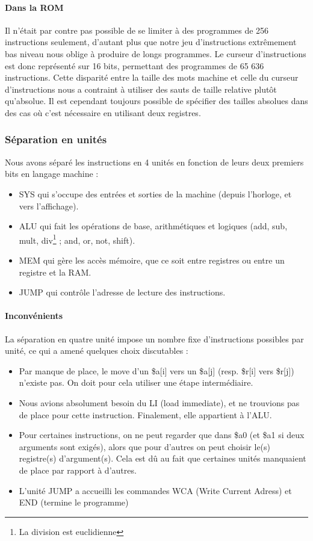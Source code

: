 \documentclass{article}
\begin{document}
\paragraph{Dans la ROM}
Il n'était par contre pas possible de se limiter à des programmes de 256 instructions
seulement, d'autant plus que notre jeu d'instructions extrêmement bas niveau nous
oblige à produire de longs programmes. Le curseur d'instructions est donc représenté
sur 16 bits, permettant des programmes de 65 636 instructions. Cette disparité
entre la taille des mots machine et celle du curseur d'instructions nous a contraint
à utiliser des sauts de taille relative plutôt qu'absolue. Il est cependant toujours
possible de spécifier des tailles absolues dans des cas où c'est nécessaire en
utilisant deux registres.

\subsubsection{Séparation en unités}
Nous avons séparé les instructions en 4 unités en fonction de leurs
deux premiers bits en langage machine :
\begin{itemize}
  \item SYS qui s'occupe des entrées et sorties de la machine (depuis
    l'horloge, et vers l'affichage).
  \item ALU qui fait les opérations de base, arithmétiques et logiques (add,
    sub, mult, div\footnote{La division est euclidienne} ; and, or, not, shift).
  \item MEM qui gère les accès mémoire, que ce soit entre registres ou entre un
  registre et la RAM.
  \item JUMP qui contrôle l'adresse de lecture des instructions.
\end{itemize}

\paragraph{Inconvénients}
La séparation en quatre unité impose un nombre fixe d'instructions possibles
par unité, ce qui a amené quelques choix discutables :
\begin{itemize}
  \item Par manque de place, le move d'un \$a[i] vers un \$a[j]
    (resp. \$r[i] vers \$r[j]) n'existe pas. On doit pour cela utiliser une
    étape intermédiaire.
  \item Nous avions absolument besoin du LI (load immediate), et ne trouvions
    pas de place pour cette instruction. Finalement, elle appartient à l'ALU.
  \item Pour certaines instructions, on ne peut regarder que dans \$a0 (et \$a1
    si deux arguments sont exigés), alors que pour d'autres on peut choisir
    le(s) registre(s) d'argument(s). Cela est dû au fait que certaines unités
    manquaient de place par rapport à d'autres.
  \item L'unité JUMP a accueilli les commandes WCA (Write Current Adress) et
    END (termine le programme)
\end{itemize}
\end{document}
